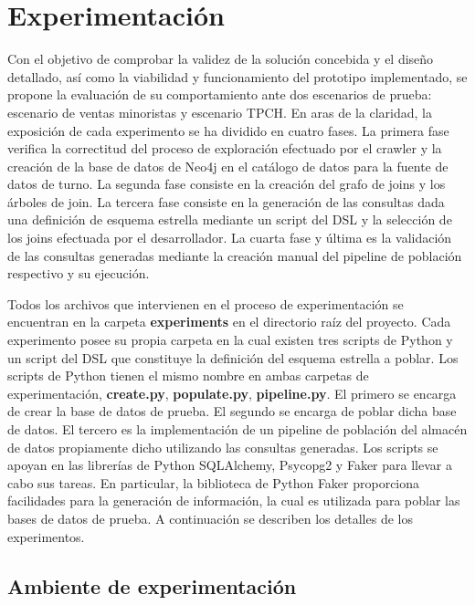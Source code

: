 \section{Experimentación} \label{section:Experimentation}

Con el objetivo de comprobar la validez de la solución concebida y el diseño detallado, así como 
la viabilidad y funcionamiento del prototipo implementado, se propone la evaluación 
de su comportamiento ante dos escenarios de prueba: escenario de ventas minoristas y escenario TPCH. En aras de 
la claridad, la exposición de cada experimento se ha dividido en cuatro fases. La primera fase verifica 
la correctitud del proceso de exploración efectuado por el crawler y la creación de la base de datos de Neo4j en el  
catálogo de datos para la fuente de datos de turno. La segunda fase consiste en la creación 
del grafo de joins y los \'arboles de join. La tercera fase consiste en la generación de las consultas dada una 
definición de esquema 
estrella mediante un script del DSL y la selección de los joins efectuada por el desarrollador. La cuarta fase y \'ultima 
es la validación de las consultas generadas 
mediante la creación manual del pipeline de población respectivo y su ejecución. 

Todos los archivos que intervienen 
en el proceso de experimentación se encuentran en la carpeta \textbf{experiments} en el directorio raíz del proyecto. 
Cada experimento posee su propia carpeta en la cual existen tres scripts de Python y un script del DSL que constituye 
la definición del esquema estrella a poblar. Los scripts de Python tienen el mismo nombre en ambas carpetas de experimentación, 
\textbf{create.py}, \textbf{populate.py}, \textbf{pipeline.py}. El primero se encarga de 
crear la base de datos de prueba. El segundo se 
encarga de poblar dicha base de datos. El tercero es la implementación de un pipeline de población del almacén de 
datos propiamente dicho utilizando 
las consultas generadas. Los scripts se apoyan en las librerías de Python SQLAlchemy, Psycopg2 y Faker para llevar a 
cabo sus tareas. En particular, la biblioteca de Python Faker proporciona facilidades para la generación de información, 
la cual es utilizada para poblar las bases de datos de prueba. A continuación se describen 
los detalles de los experimentos.

\subsection{Ambiente de experimentación}

